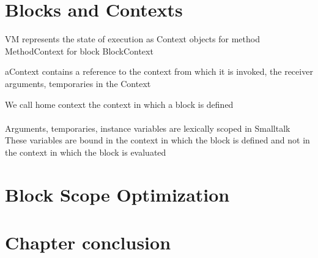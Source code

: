 \documentclass[a4paper,10pt,twoside]{book}
\begin{document}
\section{Blocks and Contexts}


VM represents the state of execution as Context objects
for method MethodContext
for block BlockContext

aContext contains a reference to the context from which it is invoked, the receiver arguments, temporaries in the Context

We call home context the context in which a block is defined


\paragraph{}
Arguments, temporaries, instance variables are lexically scoped in Smalltalk
These variables are bound in the context in which the block is defined and not in the context in which the block is evaluated




\section{Block Scope Optimization}


\section{Chapter conclusion}

\ifx\wholebook\relax\else
   
   
\end{document}
